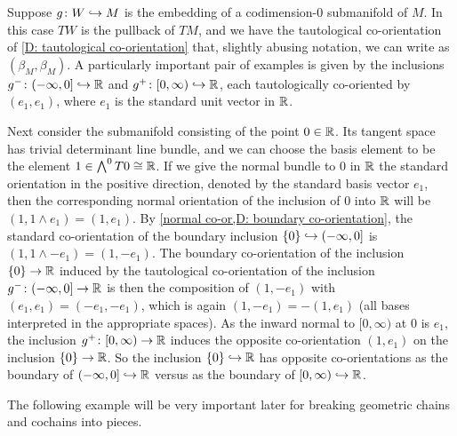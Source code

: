 \begin{example}\label{E: splitting example 1}
	Suppose $g \colon W \hookrightarrow M$ is the embedding of a codimension-$0$ submanifold of $M$.
	In this case $TW$ is the pullback of $TM$, and we have the tautological co-orientation of \cref{D: tautological co-orientation} that, slightly abusing notation, we can write as $(\beta_M,\beta_M)$.
	A particularly important pair of examples is given by the inclusions $g^- \colon (-\infty, 0] \hookrightarrow \mathbb{R}$ and $g^+ \colon [0,\infty) \hookrightarrow \mathbb{R}$, each tautologically co-oriented by $(e_1,e_1)$, where $e_1$ is the standard unit vector in $\mathbb{R}$.

	Next consider the submanifold consisting of the point $0 \in \mathbb{R}$.
	Its tangent space has trivial determinant line bundle, and we can choose the basis element to be the element $1 \in \bigwedge^0 T0 \cong \mathbb{R}$.
	If we give the normal bundle to $0$ in $\mathbb{R}$ the standard orientation in the positive direction, denoted by the standard basis vector $e_1$, then the corresponding normal orientation of the inclusion of $0$ into $\mathbb{R}$ will be $(1, 1 \wedge e_1) = (1, e_1)$.
	By \cref{normal co-or,D: boundary co-orientation}, the standard co-orientation of the boundary inclusion $\{0\} \hookrightarrow (-\infty, 0]$ is $(1, 1 \wedge -e_1) = (1, -e_1)$.
	The boundary co-orientation of the inclusion $\{0\} \to \mathbb{R}$ induced by the tautological co-orientation of the inclusion $g^- \colon (-\infty, 0] \to \mathbb{R}$ is then the composition of $(1, -e_1)$ with $(e_1, e_1)=(-e_1,-e_1)$, which is again $(1,-e_1) = -(1,e_1)$ (all bases interpreted in the appropriate spaces).
	As the inward normal to $[0,\infty)$ at $0$ is $e_1$, the inclusion $g^+ \colon [0,\infty) \to \mathbb{R}$ induces the opposite co-orientation $(1, e_1)$ on the inclusion $\{0\} \to \mathbb{R}$.
	So the inclusion $\{0\} \hookrightarrow \mathbb{R}$ has opposite co-orientations as the boundary of $(-\infty, 0] \hookrightarrow \mathbb{R}$ versus as the boundary of $[0,\infty) \hookrightarrow \mathbb{R}$.
\end{example}

The following example will be very important later for breaking geometric chains and cochains into pieces.

